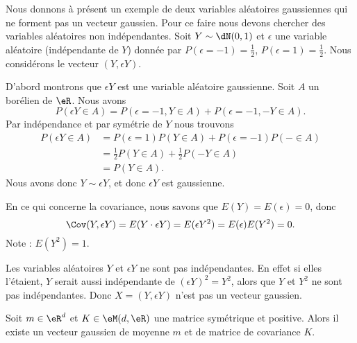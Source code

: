 \begin{example}
    Nous donnons à présent un exemple de deux variables aléatoires gaussiennes qui ne forment pas un vecteur gaussien. Pour ce faire nous devons chercher des variables aléatoires non indépendantes. Soit \( Y\sim \dN(0,1)\) et \( \epsilon\) une variable aléatoire (indépendante de \( Y\)) donnée par \( P(\epsilon=-1)=\frac{ 1 }{2}\), \( P(\epsilon=1)=\frac{ 1 }{2}\). Nous considérons le vecteur \( (Y,\epsilon Y)\).

    D'abord montrons que \( \epsilon Y\) est une variable aléatoire gaussienne. Soit \( A\) un borélien de \( \eR\). Nous avons
    \begin{equation}
        P(\epsilon Y\in A)=P(\epsilon=-1,Y\in A)+P(\epsilon=-1,-Y\in A).
    \end{equation}
    Par indépendance et par symétrie de \( Y\) nous trouvons
    \begin{subequations}
        \begin{align}
            P(\epsilon Y\in A)&=P(\epsilon=1)P(Y\in A)+P(\epsilon=-1)P(-\in A)\\
            &=\frac{ 1 }{2}P(Y\in A)+\frac{ 1 }{2}P(-Y\in A)\\
            &=P(Y\in A).
        \end{align}
    \end{subequations}
    Nous avons donc \( Y\sim \epsilon Y\), et donc \( \epsilon Y\) est gaussienne.

    En ce qui concerne la covariance, nous savons que \( E(Y)=E(\epsilon)=0\), donc
    \begin{equation}
        \Cov(Y,\epsilon Y)=E(Y\cdot \epsilon Y)=E(\epsilon Y^2)=E(\epsilon)E(Y^2)=0.
    \end{equation}
    Note : \( E(Y^2)=1\).

    Les variables aléatoires \( Y\) et \( \epsilon Y\) ne sont pas indépendantes. En effet si elles l'étaient, \( Y\) serait aussi indépendante de \( (\epsilon Y)^2=Y^2\), alors que \( Y\) et \( Y^2\) ne sont pas indépendantes. Donc \( X=(Y,\epsilon Y)\) n'est pas un vecteur gaussien.
\end{example}

\begin{theorem}
    Soit \( m\in \eR^d\) et \( K\in \eM(d,\eR)\) une matrice symétrique et positive. Alors il existe un vecteur gaussien de moyenne \( m\) et de matrice de covariance \( K\).
\end{theorem}

